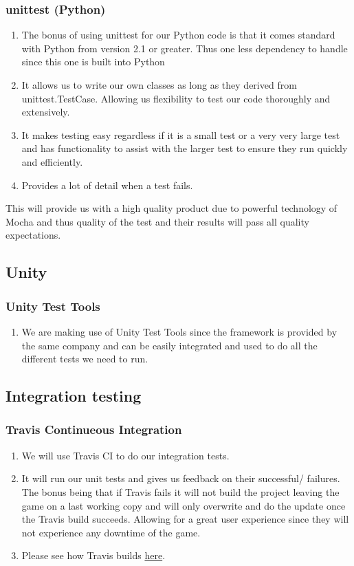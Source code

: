 \documentclass{article}
\begin{document}
		\subsubsection{unittest (Python)}
			\begin{enumerate}
				\item The bonus of using unittest for our Python code is that it comes standard with Python from version 2.1 or greater. Thus one less dependency to handle since this one is built into Python
				\item It allows us to write our own classes as long as they derived from unittest.TestCase. Allowing us flexibility to test our code thoroughly and extensively.
				\item It makes testing easy regardless if it is a small test or a very very large test and has functionality to assist with the larger test to ensure they run quickly and efficiently.
				\item Provides a lot of detail when a test fails.
			\end{enumerate}
			\noindent
			This will provide us with a high quality product due to powerful technology of Mocha and thus quality of the test and their results will pass all quality expectations.
	\subsection{Unity}
		\subsubsection{Unity Test Tools}
			\begin{enumerate}
				\item We are making use of Unity Test Tools since the framework is provided by the same company and can be easily integrated and used to do all the different tests we need to run.
			\end{enumerate}

	\subsection{Integration testing}
		\subsubsection{Travis Continueous Integration}
			\begin{enumerate}
				\item We will use Travis CI to do our integration tests.  
				\item It will run our unit tests and gives us feedback on their successful/ failures. The bonus being that if Travis fails it will not build the project leaving the game on a last working copy and will only overwrite and do the update once the Travis build succeeds. Allowing for a great user experience since they will not experience any downtime of the game. 
				\item Please see how Travis builds \href{https://travis-ci.org/KobusMarais/Cerebero/}{here}.
			\end{enumerate}
\end{document}
